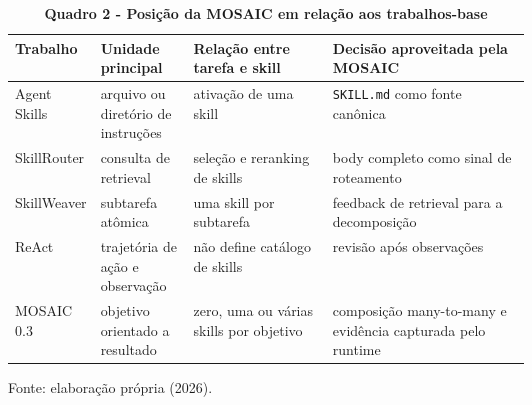 \begin{table}[H]
\centering
\caption*{\textbf{Quadro 2 - Posição da MOSAIC em relação aos trabalhos-base}}
\footnotesize
\renewcommand{\arraystretch}{1.16}
\begin{tabularx}{\linewidth}{|p{0.15\linewidth}|p{0.18\linewidth}|p{0.27\linewidth}|Y|}
\hline
\textbf{Trabalho} & \textbf{Unidade principal} &
\textbf{Relação entre tarefa e skill} & \textbf{Decisão aproveitada pela MOSAIC} \\
\hline
Agent Skills & arquivo ou diretório de instruções & ativação de uma skill &
\texttt{SKILL.md} como fonte canônica \\
\hline
SkillRouter & consulta de retrieval & seleção e reranking de skills &
body completo como sinal de roteamento \\
\hline
SkillWeaver & subtarefa atômica & uma skill por subtarefa &
feedback de retrieval para a decomposição \\
\hline
ReAct & trajetória de ação e observação & não define catálogo de skills &
revisão após observações \\
\hline
MOSAIC 0.3 & objetivo orientado a resultado & zero, uma ou várias skills por objetivo &
composição many-to-many e evidência capturada pelo runtime \\
\hline
\end{tabularx}
\par\smallskip\raggedright\small Fonte: elaboração própria (2026).
\end{table}

